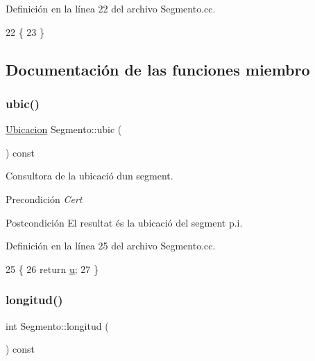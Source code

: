Definición en la línea 22 del archivo Segmento.\+cc.


\begin{DoxyCode}
22                     \{
23 \}
\end{DoxyCode}


\subsection{Documentación de las funciones miembro}
\mbox{\label{class_segmento_aeb7bfd4dcac3a1a000a33582861e0d50}} 
\subsubsection{\texorpdfstring{ubic()}{ubic()}}
{\footnotesize\ttfamily \hyperlink{class_ubicacion}{Ubicacion} Segmento\+::ubic (\begin{DoxyParamCaption}{ }\end{DoxyParamCaption}) const}



Consultora de la ubicació d\textquotesingle{}un segment. 

\begin{DoxyPrecond}{Precondición}
{\itshape Cert} 
\end{DoxyPrecond}
\begin{DoxyPostcond}{Postcondición}
El resultat és la ubicació del segment p.\+i. 
\end{DoxyPostcond}


Definición en la línea 25 del archivo Segmento.\+cc.


\begin{DoxyCode}
25                                \{
26   \textcolor{keywordflow}{return} \hyperlink{class_segmento_a7fab9490df9b1b655bb88c2deb6e72ef}{u};
27 \}
\end{DoxyCode}
\mbox{\label{class_segmento_a61c7347eb37045bef7655d3db24d7fd9}} 
\subsubsection{\texorpdfstring{longitud()}{longitud()}}
{\footnotesize\ttfamily int Segmento\+::longitud (\begin{DoxyParamCaption}{ }\end{DoxyParamCaption}) const}




